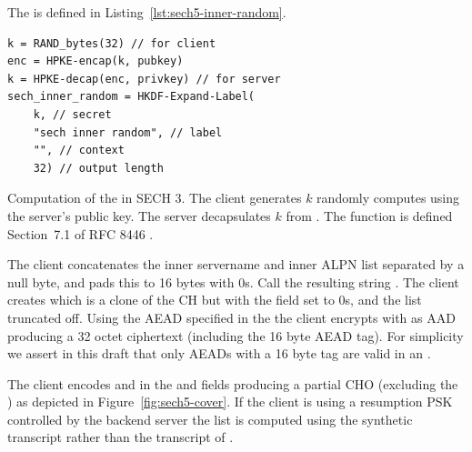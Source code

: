 The  is defined in Listing~\ref{lst:sech5-inner-random}.

\begin{listing}
    \begin{Verbatim}[frame=single]
k = RAND_bytes(32) // for client
enc = HPKE-encap(k, pubkey)
k = HPKE-decap(enc, privkey) // for server
sech_inner_random = HKDF-Expand-Label(
    k, // secret
    "sech inner random", // label
    "", // context
    32) // output length
    \end{Verbatim}
    \captionsetup{width=.8\linewidth} 
    \caption[SECH 3 Inner Random]{\label{lst:sech5-inner-random}Computation of the  in \ac{SECH} 3. The client generates $k$ randomly computes  using the server's public key. The server decapsulates $k$ from . The  function is defined Section~7.1 of RFC 8446 \citep{rfc8446}.}
\end{listing}


The client concatenates the inner servername and inner \ac{ALPN} list separated by a null byte, and pads this to 16 bytes with 0s. Call the resulting string .
The client creates  which is a clone
of the \ac{CH} but with the \varlegacysessionid{} field set to 0s,
and the  list truncated off.
Using the \ac{AEAD} specified in the  the client encrypts
 with  as \ac{AAD}
producing a 32 octet ciphertext 
(including the 16 byte \ac{AEAD} tag). 
For simplicity we assert in this draft that only \ac{AEAD}s with a 16 byte tag are valid in an .




The client encodes  and  in the  and  fields producing a partial \ac{CHO}
(excluding the )
as depicted in Figure~\ref{fig:sech5-cover}.
If the client is using a resumption \ac{PSK} controlled by the backend server
the  list is computed
using the synthetic  transcript rather
than the transcript of .


